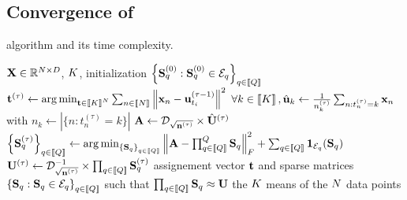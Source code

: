 \subsection{Convergence of \qkmeans}


\begin{algorithm}[t]
	\caption{\qkmeans algorithm and its time complexity.}
	\label{algo:qmeans}
	\begin{algorithmic}[1]
		
		
		\REQUIRE ${\mathbf{X}} \in \mathbb{R}^{N \times D}$, $K$, initialization $\left \lbrace {\mathbf{S}}_q^{(0)} : {\mathbf{S}}_q^{(0)} \in \mathcal{E}_q\right \rbrace_{q\in\left \llbracket Q\right \rrbracket}$
		\STATE ${\mathbf{t}}^{(\tau)} \leftarrow \operatorname*{arg\,min}_{{\mathbf{t}} \in \left \llbracket K\right \rrbracket^N} \sum_{n\in\left \llbracket N\right \rrbracket} {\left \|{\mathbf{x}}_n - {\mathbf{u}}^{(\tau -1)}_{t_i}\right \|^2}$
		\label{line:qmeans:assignment}
		\STATE $\forall k\in\left \llbracket K\right \rrbracket, \hat{{\mathbf{u}}}_k \leftarrow \frac{1}{n_k^{(\tau)}} \sum_{n: t_n^{(\tau)}= k} {{\mathbf{x}}_n}$
with $n_k \leftarrow |\{n: t_n^{(\tau)}=k\}|$
		\COMMENT{$\bigO{\nexamples\datadim}$}
		\label{line:qmeans:compute_means}
		\STATE ${\mathbf{A}} \leftarrow \mathcal{D}_{\sqrt{{\mathbf{n}}^{(\tau)}}} \times \hat{{\mathbf{U}}}^{(\tau)} $
		\COMMENT{$\bigO{\nclusters\datadim}$}
		\label{line:qmeans:A}
		\STATE $\left \lbrace {\mathbf{S}}_q^{(\tau)}\right \rbrace_{q\in\left \llbracket Q\right \rrbracket} \leftarrow \operatorname*{arg\,min}_{\left \lbrace {\mathbf{S}}_q\right \rbrace_{q\in\left \llbracket Q\right \rrbracket}} \left \|{\mathbf{A}} - \prod_{q\in\left \llbracket Q\right \rrbracket}^{Q}{{\mathbf{S}}_q}\right \|_F^2 + \sum_{q\in\left \llbracket Q\right \rrbracket} \mathbf{1}_{\mathcal{E}_q}({\mathbf{S}}_q)$\\
		\label{line:qmeans:S}
		\STATE ${\mathbf{U}}^{(\tau)} \leftarrow \mathcal{D}_{\sqrt{{\mathbf{n}}^{(\tau)}}}^{-1} \times \prod_{q\in\left \llbracket Q\right \rrbracket}{{\mathbf{S}}_q^{(\tau)}}$
		\label{line:qmeans:U}
		\ENDFOR
		\ENSURE assignement vector ${\mathbf{t}}$ and sparse matrices $\left \lbrace {\mathbf{S}}_q : {\mathbf{S}}_q \in \mathcal{E}_q\right \rbrace_{q\in\left \llbracket Q\right \rrbracket}$ such that $\prod_{q\in\left \llbracket Q\right \rrbracket}{\mathbf{S}}_q \approx {\mathbf{U}}$ the $K$ means of the $N$ data points
	\end{algorithmic}
\end{algorithm}

